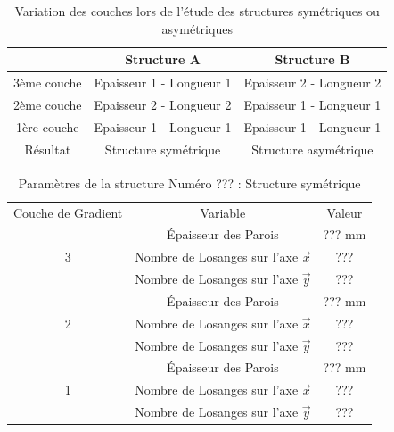 \documentclass[a4paper]{article}
\begin{document}
	\begin{table}[H]
		\centering
		\begin{tabular}{|c|c|c|}
			\hline
			\rowcolor{Gray}
			 & \textbf{Structure A} & \textbf{Structure B} \\
			\hline
			3ème couche & \textcolor[rgb]{0,0.5,0}{Epaisseur 1 - Longueur 1} & \textcolor[rgb]{1,0,0}{Epaisseur 2 - Longueur 2} \\
			\hline
			2ème couche & \textcolor[rgb]{1,0,0}{Epaisseur 2 - Longueur 2} & \textcolor[rgb]{0,0.5,0}{Epaisseur 1 - Longueur 1} \\
			\hline
			1ère couche & \textcolor[rgb]{0,0.5,0}{Epaisseur 1 - Longueur 1} & \textcolor[rgb]{0,0.5,0}{Epaisseur 1 - Longueur 1} \\
			\hline
			Résultat & Structure symétrique & Structure asymétrique \\
			\hline
		\end{tabular}
		\caption{Variation des couches lors de l'étude des structures symétriques ou asymétriques}
	\end{table}

	\begin{table}[H]
		\centering
		\begin{tabular}{|c|c|c|}
			\hline
			\rowcolor{Gray}
			\multicolumn{3}{c}{Structure de Référence}\\\hline
			\rowcolor{Gray}
			Couche de Gradient & Variable & Valeur\\
			\hline\hline
			& \textcolor[rgb]{0,0.5,0}{Épaisseur des Parois} & \textcolor[rgb]{0,0.5,0}{??? mm}\\
			\textcolor[rgb]{0,0.5,0}{3} & \textcolor[rgb]{0,0.5,0}{Nombre de Losanges sur l'axe $\vec{x}$} & \textcolor[rgb]{0,0.5,0}{???}\\
			& \textcolor[rgb]{0,0.5,0}{Nombre de Losanges sur l'axe $\vec{y}$} & \textcolor[rgb]{0,0.5,0}{???}\\
			\hline
			& \textcolor[rgb]{1,0,0}{Épaisseur des Parois} & \textcolor[rgb]{1,0,0}{??? mm}\\
			\textcolor[rgb]{1,0,0}{2} & \textcolor[rgb]{1,0,0}{Nombre de Losanges sur l'axe $\vec{x}$} & \textcolor[rgb]{1,0,0}{???}\\
			& \textcolor[rgb]{1,0,0}{Nombre de Losanges sur l'axe $\vec{y}$} & \textcolor[rgb]{1,0,0}{???}\\
			\hline
			& \textcolor[rgb]{0,0.5,0}{Épaisseur des Parois} & \textcolor[rgb]{0,0.5,0}{??? mm}\\
			\textcolor[rgb]{0,0.5,0}{1} & \textcolor[rgb]{0,0.5,0}{Nombre de Losanges sur l'axe $\vec{x}$} & \textcolor[rgb]{0,0.5,0}{???}\\
			& \textcolor[rgb]{0,0.5,0}{Nombre de Losanges sur l'axe $\vec{y}$} & \textcolor[rgb]{0,0.5,0}{???}\\
			\hline
		\end{tabular}
		\caption{Paramètres de la structure Numéro ??? : Structure symétrique}
	\end{table}
	
\end{document}
